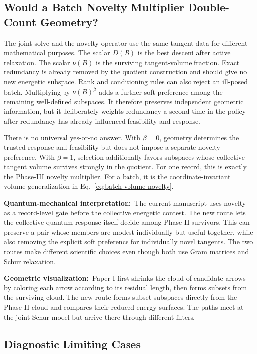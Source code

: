 \documentclass[10pt,twocolumn]{article}
\newcommand{\phys}[1]{\par\noindent\textbf{Quantum-mechanical interpretation:}\ #1\par}
\newcommand{\geom}[1]{\par\noindent\textbf{Geometric visualization:}\ \textcolor{teal!70!black}{#1}\par}
\begin{document}
\subsection*{Would a Batch Novelty Multiplier Double-Count Geometry?}

The joint solve and the novelty operator use the same tangent data for different
mathematical purposes. The scalar \(D(B)\) is the best descent after active
relaxation. The scalar \(\nu(B)\) is the surviving tangent-volume fraction.
Exact redundancy is already removed by the quotient construction and should
give no new energetic subspace. Rank and conditioning rules can also reject an
ill-posed batch. Multiplying by \(\nu(B)^\beta\) adds a further soft
preference among the remaining well-defined subspaces. It therefore preserves
independent geometric information, but it deliberately weights redundancy a
second time in the policy after redundancy has already influenced feasibility
and response.

There is no universal yes-or-no answer. With \(\beta=0\), geometry determines
the trusted response and feasibility but does not impose a separate novelty
preference. With \(\beta=1\), selection additionally favors subspaces whose
collective tangent volume survives strongly in the quotient. For one record,
this is exactly the Phase-III novelty multiplier. For a batch, it is the
coordinate-invariant volume generalization in
Eq.~\eqref{eq:batch-volume-novelty}.

\phys{The current manuscript uses novelty as a record-level gate before the
collective energetic contest. The new route lets the collective quantum
response itself decide among Phase-II survivors. This can preserve a pair whose
members are modest individually but useful together, while also removing the
explicit soft preference for individually novel tangents. The two routes make
different scientific choices even though both use Gram matrices and Schur
relaxation.}

\geom{Paper I first shrinks the cloud of candidate arrows by coloring each
arrow according to its residual length, then forms subsets from the surviving
cloud. The new route forms subset subspaces directly from the Phase-II cloud
and compares their reduced energy surfaces. The paths meet at the joint Schur
model but arrive there through different filters.}

\subsection*{Diagnostic Limiting Cases}
\end{document}
